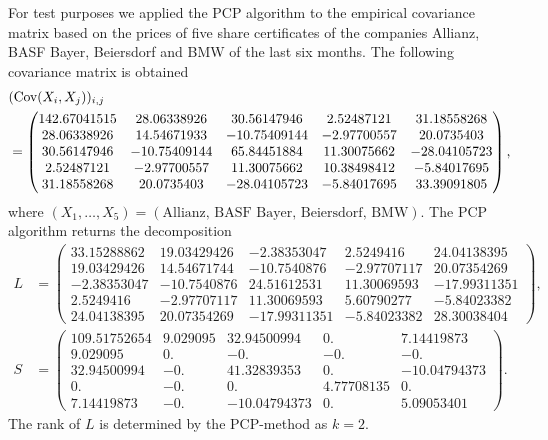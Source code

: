 For test purposes we applied the PCP algorithm to the empirical covariance matrix based on the prices of five share certificates of the companies Allianz, BASF Bayer, Beiersdorf and BMW  of the last six months. The following covariance matrix is obtained
\begin{align}
 &(\mathrm{Cov}(X_i,X_j))_{i,j} \notag \\
 &= \begin{pmatrix} 142.67041515&  28.06338926&  30.56147946&   2.52487121&
         31.18558268\\  28.06338926&  14.54671933& -10.75409144&  -2.97700557&
         20.0735403 \\  30.56147946& -10.75409144&  65.84451884&  11.30075662&
        -28.04105723\\   2.52487121&  -2.97700557&  11.30075662&  10.38498412&
         -5.84017695\\  31.18558268&  20.0735403 & -28.04105723&  -5.84017695&
         33.39091805 \end{pmatrix},
\end{align}
where $(X_1,\dots,X_5) =(\text{Allianz, BASF Bayer, Beiersdorf, BMW})$. The PCP algorithm returns the decomposition
\begin{align}
 L &= \begin{pmatrix}
       33.15288862&  19.03429426&  -2.38353047&   2.5249416 &
         24.04138395\\
         19.03429426&  14.54671744& -10.7540876 &  -2.97707117&
         20.07354269\\
         -2.38353047& -10.7540876 &  24.51612531&  11.30069593&
        -17.99311351\\ 
        2.5249416 &  -2.97707117&  11.30069593&   5.60790277&
         -5.84023382\\
         24.04138395&  20.07354269& -17.99311351&  -5.84023382&
         28.30038404
       \end{pmatrix},
       \\
S &=\begin{pmatrix}109.51752654&   9.029095  &  32.94500994&   0.        &
          7.14419873\\ 9.029095  &   0.        &  -0.        &  -0.        &
         -0.\\ 32.94500994&  -0.        &  41.32839353&   0.        &
        -10.04794373 \\ 0.        &  -0.        &   0.        &   4.77708135&
          0.        \\ 7.14419873&  -0.        & -10.04794373&   0.        &
          5.09053401
       \end{pmatrix}.
\end{align}
The rank of $L$ is determined by the PCP-method as $k=2$.

